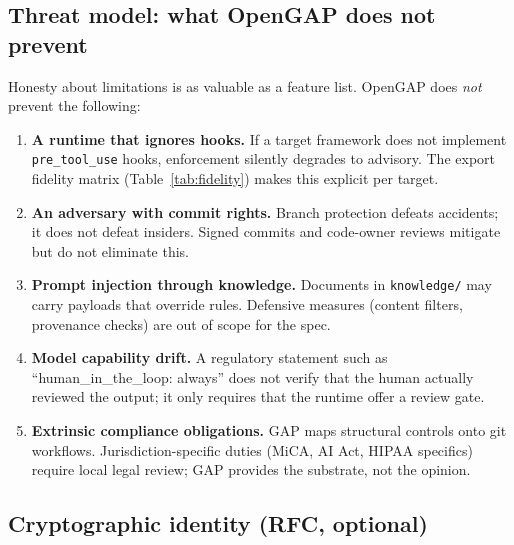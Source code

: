\documentclass[11pt,a4paper]{article}
\begin{document}
\subsection{Threat model: what OpenGAP does not prevent}\label{sec:threat}

Honesty about limitations is as valuable as a feature list. OpenGAP does \emph{not}
prevent the following:

\begin{enumerate}
  \item \textbf{A runtime that ignores hooks.} If a target framework does not implement
  \texttt{pre\_tool\_use} hooks, enforcement silently degrades to advisory. The export
  fidelity matrix (Table~\ref{tab:fidelity}) makes this explicit per target.
  \item \textbf{An adversary with commit rights.} Branch protection defeats accidents;
  it does not defeat insiders. Signed commits and code-owner reviews mitigate but do
  not eliminate this.
  \item \textbf{Prompt injection through knowledge.} Documents in \texttt{knowledge/}
  may carry payloads that override rules. Defensive measures (content filters,
  provenance checks) are out of scope for the spec.
  \item \textbf{Model capability drift.} A regulatory statement such as
  ``human\_in\_the\_loop: always'' does not verify that the human actually reviewed the
  output; it only requires that the runtime offer a review gate.
  \item \textbf{Extrinsic compliance obligations.} GAP maps structural controls onto
  git workflows. Jurisdiction-specific duties (MiCA, AI Act, HIPAA specifics) require
  local legal review; GAP provides the substrate, not the opinion.
\end{enumerate}

\subsection{Cryptographic identity (RFC, optional)}\label{sec:identity}
\end{document}
